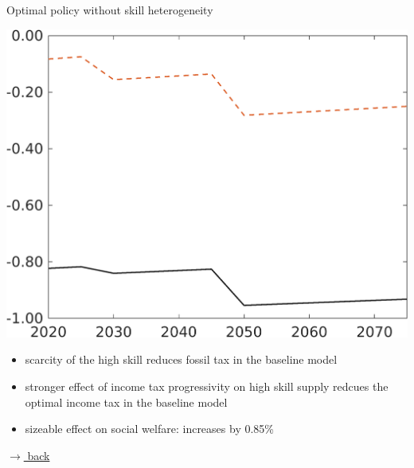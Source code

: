 \documentclass[11pt,aspectratio=169]{beamer}
\begin{document}
\begin{frame}{Optimal policy without skill heterogeneity}
\begin{minipage}[]{0.3\textwidth}
	\end{minipage}
	\begin{minipage}[]{0.3\textwidth}
		\includegraphics[width=1\textwidth]{../codding_model/own_basedOnFried/optimalPol_elastS_DisuSci/figures/all_1705/Single_OPT_T_NoTaus_SWF_spillover0_skillComp_sep1_BN0_ineq0_red0_etaa0.79_lgd0.png}
	\end{minipage}
	
	\vspace{4mm}
	\begin{itemize}
		\item scarcity of the high skill reduces fossil tax in the baseline model
		\vspace{2mm}
		\item stronger effect of income tax progressivity on high skill supply redcues the optimal income tax in the baseline model
				\vspace{2mm}
		\item sizeable effect on social welfare: increases by 0.85\%
	\end{itemize}
	\vspace{-2mm}
	\hfill
	\hyperlink{effalloback}{\tiny{$\rightarrow$ back}}
\end{frame}
\end{document}
